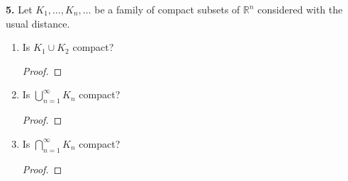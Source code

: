 \documentclass{article}
\newcommand{\R}{\mathbb{R}}
\begin{document}
\textbf{5. }
Let $K_1, \dots, K_n, \dots$ be a family of compact subsets of $\R^n$ considered with the usual distance.
\begin{enumerate}
    \item 
    Is $K_1 \cup K_2$ compact?
    \begin{proof}
        
    \end{proof}


    \item 
    Is $\bigcup_{n = 1}^\infty K_n$ compact?
    \begin{proof}
        
    \end{proof}


    \item 
    Is $\bigcap_{n = 1}^\infty K_n$ compact?
    \begin{proof}
        
    \end{proof}
\end{enumerate}

\end{document}
